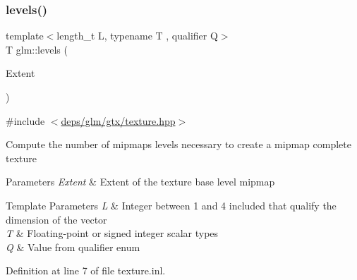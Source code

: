 \subsubsection{\texorpdfstring{levels()}{levels()}}
{\footnotesize\ttfamily template$<$length\+\_\+t L, typename T , qualifier Q$>$ \\
T glm\+::levels (\begin{DoxyParamCaption}\item[{\hyperlink{structglm_1_1vec}{vec}$<$ L, T, Q $>$ const \&}]{Extent }\end{DoxyParamCaption})\hspace{0.3cm}{\ttfamily [inline]}}



{\ttfamily \#include $<$\hyperlink{texture_8hpp}{deps/glm/gtx/texture.\+hpp}$>$}

Compute the number of mipmaps levels necessary to create a mipmap complete texture


\begin{DoxyParams}{Parameters}
{\em Extent} & Extent of the texture base level mipmap \\
\hline
\end{DoxyParams}

\begin{DoxyTemplParams}{Template Parameters}
{\em L} & Integer between 1 and 4 included that qualify the dimension of the vector \\
\hline
{\em T} & Floating-\/point or signed integer scalar types \\
\hline
{\em Q} & Value from qualifier enum \\
\hline
\end{DoxyTemplParams}


Definition at line 7 of file texture.\+inl.

